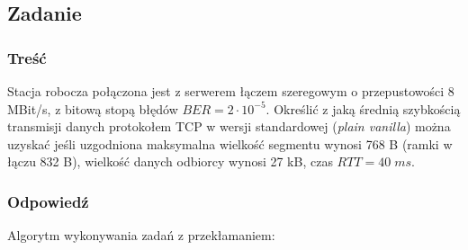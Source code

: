 	\subsection{Zadanie}
		\subsubsection{Treść}
			Stacja robocza połączona jest z serwerem łączem szeregowym o przepustowości 8 MBit/s, z bitową stopą błędów $ BER=2\cdot 10^{-5} $. Określić z jaką średnią szybkością transmisji danych protokołem TCP w wersji standardowej (\emph{plain vanilla}) można uzyskać jeśli uzgodniona maksymalna wielkość segmentu wynosi 768 B (ramki w łączu 832 B), wielkość danych odbiorcy wynosi 27 kB, czas $ RTT=40\;ms $.
		\subsubsection{Odpowiedź}
			Algorytm wykonywania zadań z przekłamaniem:
